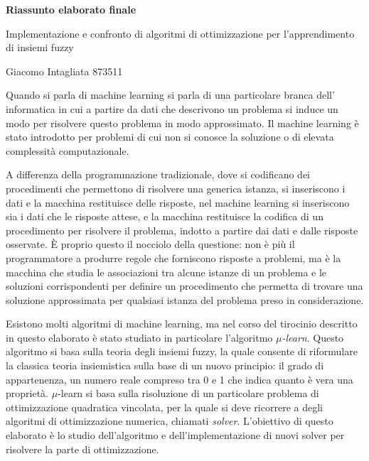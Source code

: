 \documentclass[12pt, letterpaper, twoside]{article}
\begin{document}
\begin{center}
\LARGE \textbf{Riassunto elaborato finale}
\bigskip

\large Implementazione e confronto di algoritmi di ottimizzazione per l'apprendimento di insiemi fuzzy

\bigskip

\normalsize Giacomo Intagliata 873511
\end{center}
\vspace{3\baselineskip}

\noindent Quando si parla di machine learning si parla di una particolare branca dell' informatica in cui a partire da dati che descrivono un problema si induce un modo per risolvere questo problema in modo approssimato. Il machine learning è stato introdotto per problemi di cui non si conosce la soluzione o di elevata complessità computazionale.

A differenza della programmazione tradizionale, dove si codificano dei procedimenti che permettono di risolvere una generica istanza, si inseriscono i dati e la macchina restituisce delle risposte, nel machine learning si inseriscono sia i dati che le risposte attese, e la macchina restituisce la codifica di un procedimento per risolvere il problema, indotto a partire dai dati e dalle risposte osservate. \`E proprio questo il nocciolo della questione: non è più il programmatore a produrre regole che forniscono risposte a problemi, ma è la macchina che studia le associazioni tra alcune istanze di un problema e le soluzioni corrispondenti per definire un procedimento che permetta di trovare una soluzione approssimata per qualsiasi istanza del problema preso in considerazione.

Esistono molti algoritmi di machine learning, ma nel corso del tirocinio descritto in questo elaborato è stato studiato in particolare l'algoritmo \textit{$\mu$-learn}. Questo algoritmo si basa sulla teoria degli insiemi fuzzy, la quale consente di riformulare la classica teoria insiemistica sulla base di un nuovo principio: il grado di appartenenza, un numero reale compreso tra 0 e 1 che indica quanto è vera una proprietà. {$\mu$-learn} si basa sulla risoluzione di un particolare problema di ottimizzazione quadratica vincolata, per la quale si deve ricorrere a degli algoritmi di ottimizzazione numerica, chiamati \textit{solver}.
L'obiettivo di questo elaborato è lo studio dell'algoritmo e dell'implementazione di nuovi solver per risolvere la parte di ottimizzazione.
\end{document}
